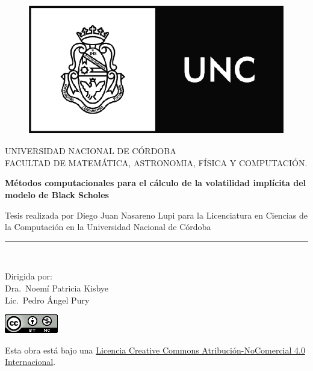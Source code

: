 \documentclass[a4paper,openright, 12pt, oneside]{book}
\begin{document}


\begin{titlepage}
\begin{center}


\begin{figure}
  \begin{center}
    \leavevmode

    \includegraphics[width=0.6\linewidth]{UNCLOGO.png}
  \end{center}
\end{figure}

\vspace*{0.4in}
UNIVERSIDAD NACIONAL DE C\'ORDOBA\\
\vspace*{0.15in}
FACULTAD DE MATEM\'ATICA, ASTRONOMIA, F\'ISICA Y COMPUTACI\'ON.\\
\vspace*{0.15in}
\begin{large}
\end{large}
\vspace*{0.2in}
\begin{Large}
\textbf{M\'etodos computacionales para el c\'alculo de la volatilidad impl\'icita del modelo de Black Scholes} \\
\end{Large}
\vspace*{0.3in}
\begin{large}
Tesis realizada por Diego Juan Nasareno Lupi para la Licenciatura en Ciencias de la Computaci\'on en la Universidad Nacional de C\'ordoba\end{large}

\vspace*{0.1in}
\rule{80mm}{0.1mm}\\
\vspace*{0.1in}
\begin{large}
Dirigida por: \\
Dra.\ Noem\'i Patricia Kisbye \\
Lic.\ Pedro \'Angel Pury\\
\vspace*{0.2in}
\end{large}
\end{center}

\begin{center}
    \includegraphics{ccmon}
\end{center}
Esta obra está bajo una \textcolor{blue}{\href{http://creativecommons.org/licenses/by-nc/4.0/}{Licencia Creative Commons Atribución-NoComercial 4.0 Internacional}}.

\end{titlepage}
\end{document}
